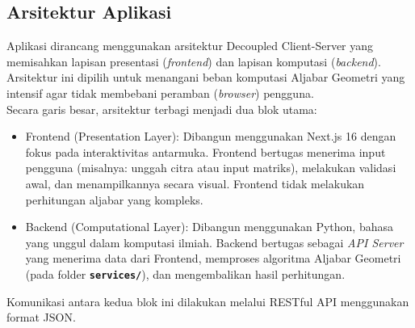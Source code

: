 \documentclass[12pt,a4paper]{article}
\begin{document}
\subsection{Arsitektur Aplikasi}
Aplikasi dirancang menggunakan arsitektur Decoupled Client-Server yang memisahkan lapisan presentasi (\textit{frontend}) dan lapisan komputasi (\textit{backend}). Arsitektur ini dipilih untuk menangani beban komputasi Aljabar Geometri yang intensif agar tidak membebani peramban (\textit{browser}) pengguna.\\

\noindent Secara garis besar, arsitektur terbagi menjadi dua blok utama:
\begin{itemize}
    \item Frontend (Presentation Layer): Dibangun menggunakan Next.js 16 dengan fokus pada interaktivitas antarmuka. Frontend bertugas menerima input pengguna (misalnya: unggah citra atau input matriks), melakukan validasi awal, dan menampilkannya secara visual. Frontend tidak melakukan perhitungan aljabar yang kompleks.
    \item Backend (Computational Layer): Dibangun menggunakan Python, bahasa yang unggul dalam komputasi ilmiah. Backend bertugas sebagai \textit{API Server} yang menerima data dari Frontend, memproses algoritma Aljabar Geometri (pada folder \textbf{\texttt{services/}}), dan mengembalikan hasil perhitungan.
\end{itemize}
Komunikasi antara kedua blok ini dilakukan melalui RESTful API menggunakan format JSON.
\end{document}
